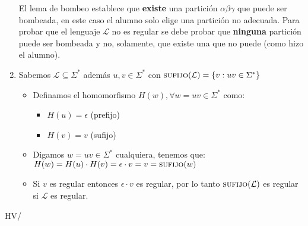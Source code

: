 \documentclass[spanish, fleqn]{article}
\begin{document}
\begin{enumerate}
			El lema de bombeo establece que \textbf{existe} una partición
			$\alpha\beta\gamma$ que puede ser bombeada, en este caso el alumno
			solo elige una partición no adecuada. Para probar que el lenguaje
			$\mathcal{L}$ no es regular se debe probar que \textbf{ninguna} 
			partición puede ser bombeada y no, solamente, que existe una que no
			puede (como hizo el alumno).
		\item 
			Sabemos $\mathcal{L} \subseteq \Sigma^{*}$ además $u,v \in 
			\Sigma^{*}$ con $\textsc{sufijo}(\mathcal{L}) = \{v: uv \in 
			\Sigma^{*}\}$
			\begin{itemize}
				\item
					Definamos el homomorfismo $H(w), \forall w = uv \in \Sigma^{*}$
					como:
					\begin{itemize}
						\item
							$H(u) = \epsilon$ (prefijo)
						\item
							$H(v) = v$ (sufijo)
					\end{itemize}
				\item
					Digamos $w = uv \in \Sigma^{*}$ cualquiera, tenemos que:
					$H(w) = H(u)\cdot H(v) = \epsilon \cdot v = v = 
					\textsc{sufijo}(w)$
				\item
					Si $v$ es regular entonces $\epsilon \cdot v$ es regular,
					por lo tanto $\textsc{sufijo}(\mathcal{L})$ es regular si
					$\mathcal{L}$ es regular.
			\end{itemize}
	\end{enumerate}

\vfill\hfill HV/\LaTeXe
\end{document}
